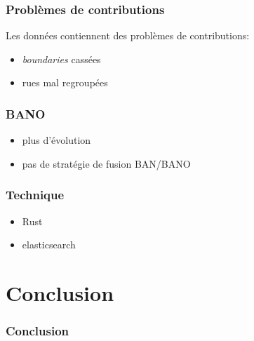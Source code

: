 \documentclass[table]{beamer}
\newcommand*{\foreign}[2][english]{%
    \emph{\foreignlanguage{#1}{#2}}%
}
\begin{document}
\begin{frame}
  \frametitle{Problèmes de contributions}

  Les données contiennent des problèmes de contributions:
  \begin{itemize}
  \item \foreign{boundaries} cassées
  \item rues mal regroupées
  \end{itemize}
\end{frame}

\begin{frame}
  \frametitle{BANO}

  \begin{itemize}
  \item plus d'évolution
  \item pas de stratégie de fusion BAN/BANO
  \end{itemize}
\end{frame}

\begin{frame}
  \frametitle{Technique}

  \begin{itemize}
  \item Rust
  \item elasticsearch
  \end{itemize}
\end{frame}

\section{Conclusion}

\begin{frame}
  \frametitle{Conclusion}

\end{frame}

\begin{frame}
  \titlepage
\end{frame}
\end{document}
